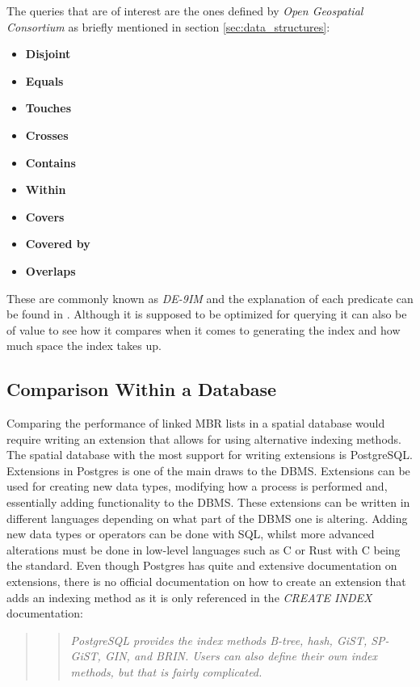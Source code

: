 The queries that are of interest are the ones defined by \textit{Open Geospatial Consortium} as briefly mentioned in section \ref{sec:data_structures}:
\begin{itemize}
	\item \textbf{Disjoint}
	\item \textbf{Equals}
	\item \textbf{Touches}
	\item \textbf{Crosses}
	\item \textbf{Contains}
	\item \textbf{Within}
	\item \textbf{Covers}
	\item \textbf{Covered by}
	\item \textbf{Overlaps}
	
\end{itemize}

These are commonly known as \textit{DE-9IM} and the explanation of each predicate can be found in \cite{spatial_predicates}. Although it is supposed to be optimized for querying it can also be of value to see how it compares when it comes to generating the index and how much space the index takes up.

\subsection{Comparison Within a Database}
Comparing the performance of linked MBR lists in a spatial database would require writing an extension that allows for using alternative indexing methods. The spatial database with the most support for writing extensions is PostgreSQL. Extensions in Postgres is one of the main draws to the DBMS. Extensions can be used for creating new data types, modifying how a process is performed and, essentially adding functionality to the DBMS. These extensions can be written in different languages depending on what part of the DBMS one is altering. Adding new data types or operators can be done with SQL, whilst more advanced alterations must be done in low-level languages such as C or Rust with C being the standard. Even though Postgres has quite and extensive documentation on extensions, there is no official documentation on how to create an extension that adds an indexing method as it is only referenced in the \textit{CREATE INDEX} documentation:
\begin{quote}
	\blockquote{\textit{PostgreSQL provides the index methods B-tree, hash, GiST, SP-GiST, GIN, and BRIN. Users can also define their own index methods, but that is fairly complicated.}} \cite{postgres_create_index}
\end{quote}

